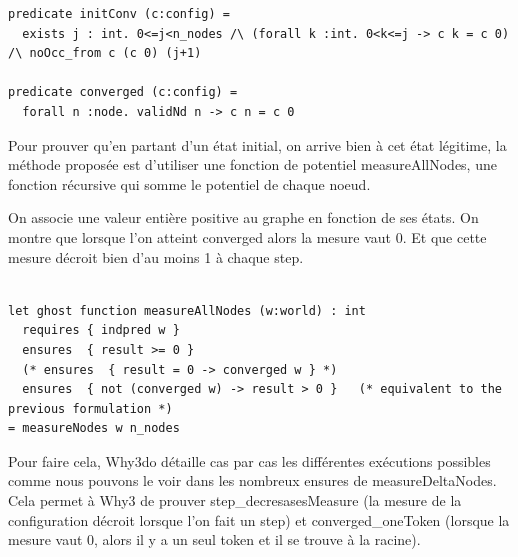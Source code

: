 \documentclass[11pt]{article}
\begin{document}
\lstset{language=why3,label= ,caption= ,captionpos=b,numbers=none}
\begin{lstlisting}
predicate initConv (c:config) =
  exists j : int. 0<=j<n_nodes /\ (forall k :int. 0<k<=j -> c k = c 0) /\ noOcc_from c (c 0) (j+1)

predicate converged (c:config) =
  forall n :node. validNd n -> c n = c 0

\end{lstlisting}


Pour prouver qu'en partant d'un état initial, on arrive bien à cet état légitime, 
la méthode proposée est d'utiliser une fonction de potentiel measureAllNodes,
une fonction récursive qui somme le potentiel de chaque noeud.



On associe une valeur entière positive au graphe en fonction de ses états.
On montre que lorsque l'on atteint converged alors la mesure vaut 0. 
Et que cette mesure décroit bien d'au moins 1 à chaque step. 


\lstset{language=why3,label= ,caption= ,captionpos=b,numbers=none}
\begin{lstlisting}

let ghost function measureAllNodes (w:world) : int
  requires { indpred w }
  ensures  { result >= 0 }
  (* ensures  { result = 0 -> converged w } *)
  ensures  { not (converged w) -> result > 0 }   (* equivalent to the previous formulation *)
= measureNodes w n_nodes

\end{lstlisting}

Pour faire cela, Why3do détaille cas par cas les différentes exécutions possibles comme nous
pouvons le voir dans les nombreux ensures de measureDeltaNodes. 
Cela permet à Why3 de prouver step\_decresasesMeasure (la mesure de la configuration décroit lorsque l'on fait un step)
 et converged\_oneToken (lorsque la mesure vaut 0, alors il y a un seul token et il se trouve à la racine).  
\end{document}
